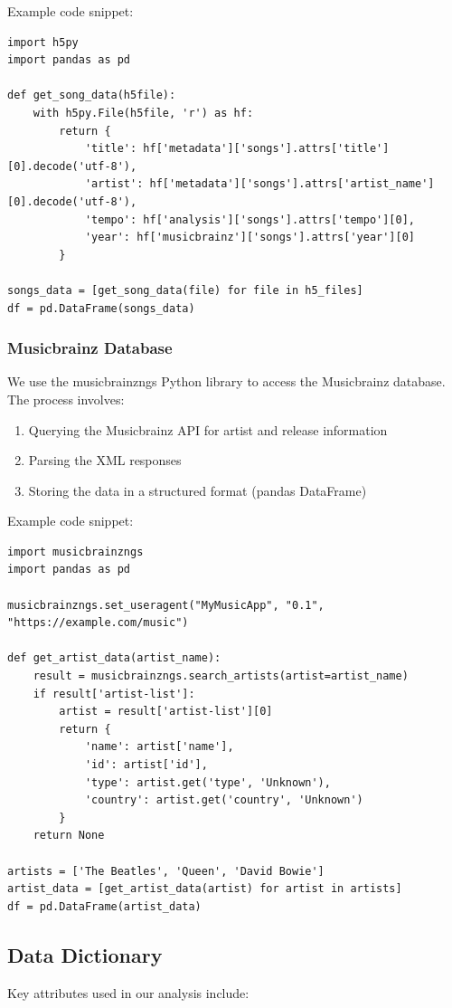 \documentclass[runningheads]{llncs}
\begin{document}
Example code snippet:

\begin{verbatim}
import h5py
import pandas as pd

def get_song_data(h5file):
    with h5py.File(h5file, 'r') as hf:
        return {
            'title': hf['metadata']['songs'].attrs['title'][0].decode('utf-8'),
            'artist': hf['metadata']['songs'].attrs['artist_name'][0].decode('utf-8'),
            'tempo': hf['analysis']['songs'].attrs['tempo'][0],
            'year': hf['musicbrainz']['songs'].attrs['year'][0]
        }

songs_data = [get_song_data(file) for file in h5_files]
df = pd.DataFrame(songs_data)
\end{verbatim}

\subsubsection{Musicbrainz Database}
We use the musicbrainzngs Python library to access the Musicbrainz database. The process involves:
\begin{enumerate}
    \item Querying the Musicbrainz API for artist and release information
    \item Parsing the XML responses
    \item Storing the data in a structured format (pandas DataFrame)
\end{enumerate}

Example code snippet:

\begin{verbatim}
import musicbrainzngs
import pandas as pd

musicbrainzngs.set_useragent("MyMusicApp", "0.1", "https://example.com/music")

def get_artist_data(artist_name):
    result = musicbrainzngs.search_artists(artist=artist_name)
    if result['artist-list']:
        artist = result['artist-list'][0]
        return {
            'name': artist['name'],
            'id': artist['id'],
            'type': artist.get('type', 'Unknown'),
            'country': artist.get('country', 'Unknown')
        }
    return None

artists = ['The Beatles', 'Queen', 'David Bowie']
artist_data = [get_artist_data(artist) for artist in artists]
df = pd.DataFrame(artist_data)
\end{verbatim}

\subsection{Data Dictionary}
Key attributes used in our analysis include:
\end{document}
